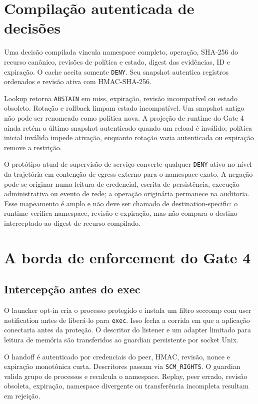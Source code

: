\documentclass[11pt,a4paper]{article}
\begin{document}
\section{Compilação autenticada de decisões}

Uma decisão compilada vincula namespace completo, operação, SHA-256 do recurso
canônico, revisões de política e estado, digest das evidências, ID e expiração.
O cache aceita somente \texttt{DENY}. Seu snapshot autentica registros ordenados
e revisão ativa com HMAC-SHA-256.

Lookup retorna \texttt{ABSTAIN} em miss, expiração, revisão incompatível ou
estado obsoleto. Rotação e rollback limpam estado incompatível. Um snapshot
antigo não pode ser renomeado como política nova. A projeção de runtime do Gate
4 ainda retém o último snapshot autenticado quando um reload é inválido; política
inicial inválida impede ativação, enquanto rotação vazia autenticada ou expiração
remove a restrição.

O protótipo atual de supervisão de serviço converte qualquer \texttt{DENY} ativo
no nível da trajetória em contenção de egress externo para o namespace exato.
A negação pode se originar numa leitura de credencial, escrita de persistência,
execução administrativa ou evento de rede; a operação originária permanece na
auditoria. Esse mapeamento é amplo e não deve ser chamado de
destination-specific: o runtime verifica namespace, revisão e expiração, mas
não compara o destino interceptado ao digest de recurso compilado.

\section{A borda de enforcement do Gate 4}

\subsection{Intercepção antes do exec}

O launcher opt-in cria o processo protegido e instala um filtro seccomp com user
notification antes de liberá-lo para \texttt{exec}. Isso fecha a corrida em que
a aplicação conectaria antes da proteção. O descritor do listener e um adapter
limitado para leitura de memória são transferidos ao guardian persistente por
socket Unix.

O handoff é autenticado por credenciais do peer, HMAC, revisão, nonce e expiração
monotônica curta. Descritores passam via \texttt{SCM\_RIGHTS}. O guardian valida
grupo de processos e recalcula o namespace. Replay, peer errado, revisão
obsoleta, expiração, namespace divergente ou transferência incompleta resultam
em rejeição.
\end{document}
